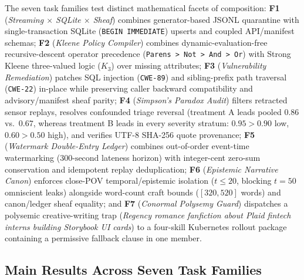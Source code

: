 \documentclass[11pt]{article}
\theoremstyle{definition}
\theoremstyle{plain}
\begin{document}
The seven task families test distinct mathematical facets of composition:
\textbf{F1} (\emph{Streaming $\times$ SQLite $\times$ Sheaf}) combines generator-based JSONL quarantine with single-transaction SQLite (\texttt{BEGIN IMMEDIATE}) upserts and coupled API/manifest schemas;
\textbf{F2} (\emph{Kleene Policy Compiler}) combines dynamic-evaluation-free recursive-descent operator precedence (\texttt{Parens > Not > And > Or}) with Strong Kleene three-valued logic ($K_3$) \citep{kleene1952introduction} over missing attributes;
\textbf{F3} (\emph{Vulnerability Remediation}) patches SQL injection (\texttt{CWE-89}) and sibling-prefix path traversal (\texttt{CWE-22}) in-place while preserving caller backward compatibility and advisory/manifest sheaf parity;
\textbf{F4} (\emph{Simpson's Paradox Audit}) filters retracted sensor replays, resolves confounded triage reversal \citep{simpson1951interpretation} (treatment A leads pooled $0.86$ vs.\ $0.67$, whereas treatment B leads in every severity stratum: $0.95 > 0.90$ low, $0.60 > 0.50$ high), and verifies UTF-8 SHA-256 quote provenance;
\textbf{F5} (\emph{Watermark Double-Entry Ledger}) combines out-of-order event-time watermarking ($300\text{-second}$ lateness horizon) with integer-cent zero-sum conservation and idempotent replay deduplication;
\textbf{F6} (\emph{Epistemic Narrative Canon}) enforces close-POV temporal/epistemic isolation ($t \le 20$, blocking $t = 50$ omniscient leaks) alongside word-count craft bounds ($[320, 520]$ words) and canon/ledger sheaf equality; and
\textbf{F7} (\emph{Conormal Polysemy Guard}) dispatches a polysemic creative-writing trap (\emph{Regency romance fanfiction about Plaid fintech interns building Storybook UI cards}) to a four-skill Kubernetes rollout package containing a permissive fallback clause in one member.

\subsection{Main Results Across Seven Task Families}
\label{subsec:main-results}
\end{document}
